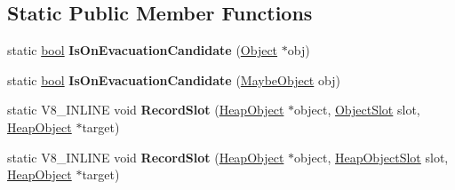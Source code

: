 \subsection*{Static Public Member Functions}
\begin{DoxyCompactItemize}
\item 
\mbox{\label{classv8_1_1internal_1_1MarkCompactCollector_a0abc63f47175706d281816006d022508}} 
static \mbox{\hyperlink{classbool}{bool}} {\bfseries Is\+On\+Evacuation\+Candidate} (\mbox{\hyperlink{classv8_1_1internal_1_1Object}{Object}} $\ast$obj)
\item 
\mbox{\label{classv8_1_1internal_1_1MarkCompactCollector_a35752614f65ab902faa4ea9196dd369a}} 
static \mbox{\hyperlink{classbool}{bool}} {\bfseries Is\+On\+Evacuation\+Candidate} (\mbox{\hyperlink{classv8_1_1internal_1_1MaybeObject}{Maybe\+Object}} obj)
\item 
\mbox{\label{classv8_1_1internal_1_1MarkCompactCollector_a92822094ae0d190711b58298e9b9bc30}} 
static V8\+\_\+\+I\+N\+L\+I\+NE void {\bfseries Record\+Slot} (\mbox{\hyperlink{classv8_1_1internal_1_1HeapObject}{Heap\+Object}} $\ast$object, \mbox{\hyperlink{classv8_1_1internal_1_1ObjectSlot}{Object\+Slot}} slot, \mbox{\hyperlink{classv8_1_1internal_1_1HeapObject}{Heap\+Object}} $\ast$target)
\item 
\mbox{\label{classv8_1_1internal_1_1MarkCompactCollector_a4c6bc8969bd3cfacd70160782de86add}} 
static V8\+\_\+\+I\+N\+L\+I\+NE void {\bfseries Record\+Slot} (\mbox{\hyperlink{classv8_1_1internal_1_1HeapObject}{Heap\+Object}} $\ast$object, \mbox{\hyperlink{classv8_1_1internal_1_1HeapObjectSlot}{Heap\+Object\+Slot}} slot, \mbox{\hyperlink{classv8_1_1internal_1_1HeapObject}{Heap\+Object}} $\ast$target)
\end{DoxyCompactItemize}
